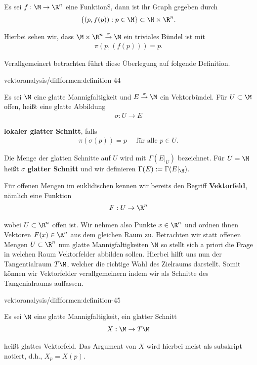 \documentclass[letterpaper,10pt,english]{jupyterBook}
\begin{document}
\par
Es sei \(f:\M\to\R^n\) eine Funktion\$, dann ist ihr Graph gegeben durch
\begin{align*}
\{(p,f(p)): p\in\M\}\subset \M\times\R^n.
\end{align*}
\par
Hierbei sehen wir, dass \(\M\times\R^n\overset{\pi}{\to}\M\) ein triviales Bündel ist mit
\begin{align*}
\pi(p,(f(p))) = p.
\end{align*}
\par
Verallgemeinert betrachten führt diese Überlegung auf folgende Definition.
\begin{definition}{}{vektoranalysis/diffformen:definition-44}



\par
Es sei \(\M\) eine glatte Mannigfaltigkeit und \(E\overset{\pi}{\to}\M\) ein Vektorbündel. Für \(U\subset\M\) offen, heißt eine glatte Abbildung
\begin{align*}
\sigma: U\to E
\end{align*}
\par
\textbf{lokaler glatter Schnitt}, falls
\begin{align*}
\pi(\sigma(p)) = p\quad\text{ für alle }p\in U.
\end{align*}
\par
Die Menge der glatten Schnitte auf \(U\) wird mit \(\Gamma(E\rvert_U)\) bezeichnet. Für \(U=\M\) heißt \(\sigma\) \textbf{glatter Schnitt} und wir definieren
\(\Gamma(E):=\Gamma(E\rvert_\M)\).
\end{definition}

\par
Für offenen Mengen im euklidischen kennen wir bereits den Begriff \textbf{Vektorfeld}, nämlich eine Funktion
\begin{align*}
F:U\to\R^n
\end{align*}
\par
wobei \(U\subset\R^n\) offen ist. Wir nehmen also Punkte \(x\in\R^n\) und ordnen ihnen Vektoren \(F(x)\in\R^n\) aus dem gleichen Raum zu. Betrachten wir statt offenen Mengen \(U\subset\R^n\) nun glatte Mannigfaltigkeiten \(\M\) so stellt sich a priori die Frage in welchen Raum Vektorfelder abbilden sollen. Hierbei hilft uns nun der Tangentialraum \(T\M\), welcher die richtige Wahl des Zielraums darstellt. Somit können wir Vektorfelder verallgemeinern indem wir als Schnitte des Tangenialraums auffassen.
\begin{definition}{}{vektoranalysis/diffformen:definition-45}



\par
Es sei \(\M\) eine glatte Mannigfaltigkeit, ein glatter Schnitt
\begin{align*}
X:\M\to T\M
\end{align*}
\par
heißt glattes Vektorfeld. Das Argument von \(X\) wird hierbei meist als subskript notiert, d.h., \(X_p = X(p)\).
\end{definition}
\end{document}
